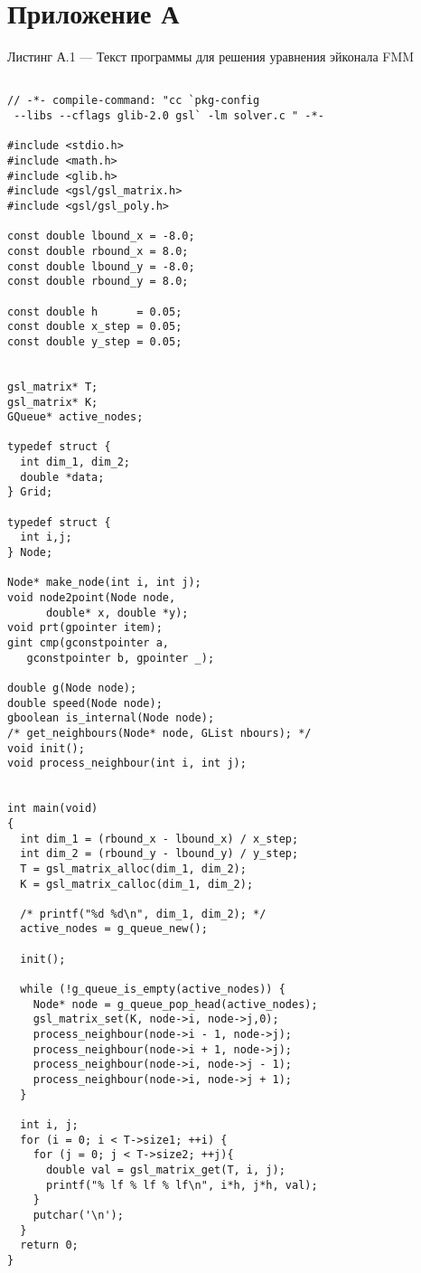 \pagebreak
\section*{Приложение А}
\label{sec:appl}

\vspace{1em}
Листинг А.1 --- Текст программы для решения уравнения эйконала FMM

\small
\begin{verbatim}

// -*- compile-command: "cc `pkg-config
 --libs --cflags glib-2.0 gsl` -lm solver.c " -*-

#include <stdio.h>
#include <math.h>
#include <glib.h>
#include <gsl/gsl_matrix.h>
#include <gsl/gsl_poly.h>

const double lbound_x = -8.0;
const double rbound_x = 8.0;
const double lbound_y = -8.0;
const double rbound_y = 8.0;

const double h      = 0.05;
const double x_step = 0.05;
const double y_step = 0.05;


gsl_matrix* T;
gsl_matrix* K;
GQueue* active_nodes;

typedef struct {
  int dim_1, dim_2;
  double *data;
} Grid;

typedef struct {
  int i,j;
} Node;

Node* make_node(int i, int j);
void node2point(Node node, 
      double* x, double *y);
void prt(gpointer item);
gint cmp(gconstpointer a, 
   gconstpointer b, gpointer _);

double g(Node node);
double speed(Node node);
gboolean is_internal(Node node);
/* get_neighbours(Node* node, GList nbours); */
void init();
void process_neighbour(int i, int j);


int main(void)
{
  int dim_1 = (rbound_x - lbound_x) / x_step;
  int dim_2 = (rbound_y - lbound_y) / y_step;
  T = gsl_matrix_alloc(dim_1, dim_2);
  K = gsl_matrix_calloc(dim_1, dim_2);

  /* printf("%d %d\n", dim_1, dim_2); */
  active_nodes = g_queue_new();

  init();

  while (!g_queue_is_empty(active_nodes)) {
    Node* node = g_queue_pop_head(active_nodes);
    gsl_matrix_set(K, node->i, node->j,0);
    process_neighbour(node->i - 1, node->j);
    process_neighbour(node->i + 1, node->j);
    process_neighbour(node->i, node->j - 1);
    process_neighbour(node->i, node->j + 1);
  }

  int i, j;
  for (i = 0; i < T->size1; ++i) {
    for (j = 0; j < T->size2; ++j){
      double val = gsl_matrix_get(T, i, j);
      printf("% lf % lf % lf\n", i*h, j*h, val);
    }
    putchar('\n');
  }
  return 0;
}


\end{verbatim}
